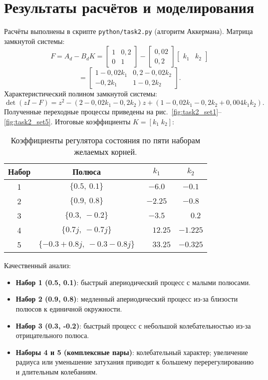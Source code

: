 \section{Результаты расчётов и моделирования}
Расчёты выполнены в скрипте \texttt{python/task2.py} (алгоритм Аккермана). Матрица замкнутой системы:
\[
  F = A_d - B_d K = \begin{bmatrix} 1 & 0{,}2 \\ 0 & 1 \end{bmatrix} - \begin{bmatrix} 0{,}02 \\ 0{,}2 \end{bmatrix} \begin{bmatrix} k_1 & k_2 \end{bmatrix}
\]
\[
  = \begin{bmatrix} 1-0{,}02k_1 & 0{,}2-0{,}02k_2 \\ -0{,}2k_1 & 1-0{,}2k_2 \end{bmatrix}.
\]
Характеристический полином замкнутой системы:
\[
  \det(zI - F) = z^2 - (2-0{,}02k_1-0{,}2k_2)z + (1-0{,}02k_1-0{,}2k_2+0{,}004k_1k_2).
\]
Полученные переходные процессы приведены на рис.~\ref{fig:task2_set1}–\ref{fig:task2_set5}. Итоговые коэффициенты \(K=[k_1\;k_2]\):

\begin{table}[H]
  \centering
  \begin{tabular}{cccc}
    \toprule
    Набор & Полюса & $k_1$ & $k_2$ \\
    \midrule
    1 & $\{0.5,\ 0.1\}$ & $-6.0$ & $-0.1$ \\
    2 & $\{0.9,\ 0.8\}$ & $-2.25$ & $-0.8$ \\
    3 & $\{0.3,\ -0.2\}$ & $-3.5$ & $\phantom{-}0.2$ \\
    4 & $\{0.7j,\ -0.7j\}$ & $\phantom{-}12.25$ & $-1.225$ \\
    5 & $\{-0.3\!+\!0.8j,\ -0.3\!-\!0.8j\}$ & $\phantom{-}33.25$ & $-0.325$ \\
    \bottomrule
  \end{tabular}
  \caption{Коэффициенты регулятора состояния по пяти наборам желаемых корней.}
\end{table}

Качественный анализ:
\begin{itemize}
  \item \textbf{Набор 1 (0.5, 0.1)}: быстрый апериодический процесс с малыми полюсами.
  \item \textbf{Набор 2 (0.9, 0.8)}: медленный апериодический процесс из-за близости полюсов к единичной окружности.
  \item \textbf{Набор 3 (0.3, -0.2)}: быстрый процесс с небольшой колебательностью из-за отрицательного полюса.
  \item \textbf{Наборы 4 и 5 (комплексные пары)}: колебательный характер; увеличение радиуса или уменьшение затухания приводит к большему перерегулированию и длительным колебаниям.
\end{itemize}

